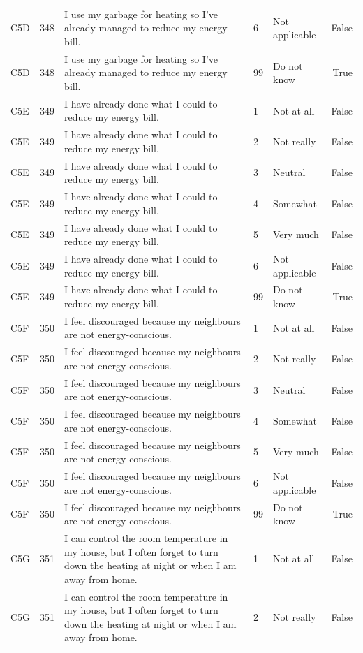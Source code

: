 \begin{tabular}{lrlllr}
C5D & 348 & I use my garbage for heating so I’ve already managed to reduce my energy bill. & 6 & Not applicable & False \\
C5D & 348 & I use my garbage for heating so I’ve already managed to reduce my energy bill. & 99 & Do not know & True \\
C5E & 349 & I have already done what I could to reduce my energy bill. & 1 & Not at all & False \\
C5E & 349 & I have already done what I could to reduce my energy bill. & 2 & Not really & False \\
C5E & 349 & I have already done what I could to reduce my energy bill. & 3 & Neutral & False \\
C5E & 349 & I have already done what I could to reduce my energy bill. & 4 & Somewhat & False \\
C5E & 349 & I have already done what I could to reduce my energy bill. & 5 & Very much & False \\
C5E & 349 & I have already done what I could to reduce my energy bill. & 6 & Not applicable & False \\
C5E & 349 & I have already done what I could to reduce my energy bill. & 99 & Do not know & True \\
C5F & 350 & I feel discouraged because my neighbours are not energy-conscious. & 1 & Not at all & False \\
C5F & 350 & I feel discouraged because my neighbours are not energy-conscious. & 2 & Not really & False \\
C5F & 350 & I feel discouraged because my neighbours are not energy-conscious. & 3 & Neutral & False \\
C5F & 350 & I feel discouraged because my neighbours are not energy-conscious. & 4 & Somewhat & False \\
C5F & 350 & I feel discouraged because my neighbours are not energy-conscious. & 5 & Very much & False \\
C5F & 350 & I feel discouraged because my neighbours are not energy-conscious. & 6 & Not applicable & False \\
C5F & 350 & I feel discouraged because my neighbours are not energy-conscious. & 99 & Do not know & True \\
C5G & 351 & I can control the room temperature in my house, but I often forget to turn down the heating at night or when I am away from home. & 1 & Not at all & False \\
C5G & 351 & I can control the room temperature in my house, but I often forget to turn down the heating at night or when I am away from home. & 2 & Not really & False \\

\end{tabular}
